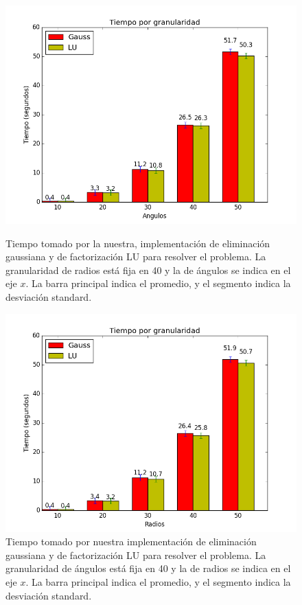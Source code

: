 \begin{figure}[H]
\centering
\begin{minipage}{0.48\textwidth}
  \centering
    \includegraphics[width=1\textwidth]{imgs/tiempos_vanilla_angulos.png}
  \caption{\footnotesize{Tiempo tomado por la nuestra, implementación de eliminación gaussiana y de factorización LU para resolver el problema. La granularidad de radios está fija en 40 y la de ángulos se indica en el eje $x$. La barra principal indica el promedio, y el segmento indica la desviación standard.}}
  \label{fig:tiempo1}
\end{minipage}%
\hspace{0.03\textwidth}
\begin{minipage}{0.48\textwidth}   
  \centering
    \includegraphics[width=1\textwidth]{imgs/tiempos_vanilla_radios.png} 
  \caption{\footnotesize{Tiempo tomado por nuestra implementación de eliminación gaussiana y de factorización LU para resolver el problema. La granularidad de ángulos está fija en 40 y la de radios se indica en el eje $x$. La barra principal indica el promedio, y el segmento indica la desviación standard.}}
  \label{fig:tiempo2}
\end{minipage}
\end{figure}




